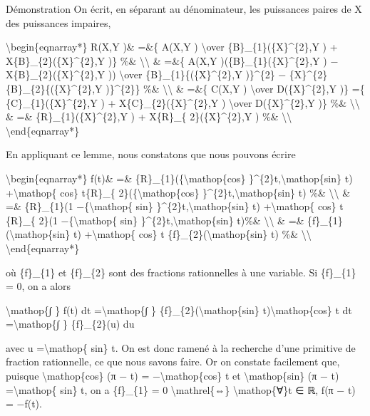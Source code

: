 \documentclass[]{article}
\begin{document}
Démonstration On écrit, en séparant au dénominateur, les puissances
paires de X des puissances impaires,

\textbackslash{}begin\{eqnarray*\} R(X,Y )\& =\&\{ A(X,Y )
\textbackslash{}over \{B\}\_\{1\}(\{X\}\^{}\{2\},Y ) +
X\{B\}\_\{2\}(\{X\}\^{}\{2\},Y )\} \%\& \textbackslash{}\textbackslash{}
\& =\&\{ A(X,Y )(\{B\}\_\{1\}(\{X\}\^{}\{2\},Y ) −
X\{B\}\_\{2\}(\{X\}\^{}\{2\},Y )) \textbackslash{}over
\{B\}\_\{1\}\{(\{X\}\^{}\{2\},Y )\}\^{}\{2\} −
\{X\}\^{}\{2\}\{B\}\_\{2\}\{(\{X\}\^{}\{2\},Y )\}\^{}\{2\}\} \%\&
\textbackslash{}\textbackslash{} \& =\&\{ C(X,Y ) \textbackslash{}over
D(\{X\}\^{}\{2\},Y )\} =\{ \{C\}\_\{1\}(\{X\}\^{}\{2\},Y ) +
X\{C\}\_\{2\}(\{X\}\^{}\{2\},Y ) \textbackslash{}over D(\{X\}\^{}\{2\},Y
)\} \%\& \textbackslash{}\textbackslash{} \& =\&
\{R\}\_\{1\}(\{X\}\^{}\{2\},Y ) + X\{R\}\_\{ 2\}(\{X\}\^{}\{2\},Y ) \%\&
\textbackslash{}\textbackslash{} \textbackslash{}end\{eqnarray*\}

En appliquant ce lemme, nous constatons que nous pouvons écrire

\textbackslash{}begin\{eqnarray*\} f(t)\& =\&
\{R\}\_\{1\}(\{\textbackslash{}mathop\{cos\}
\}\^{}\{2\}t,\textbackslash{}mathop\{sin\} t) +\textbackslash{}mathop\{
cos\} t\{R\}\_\{ 2\}(\{\textbackslash{}mathop\{cos\}
\}\^{}\{2\}t,\textbackslash{}mathop\{sin\} t) \%\&
\textbackslash{}\textbackslash{} \& =\& \{R\}\_\{1\}(1
−\{\textbackslash{}mathop\{ sin\}
\}\^{}\{2\}t,\textbackslash{}mathop\{sin\} t) +\textbackslash{}mathop\{
cos\} t \{R\}\_\{ 2\}(1 −\{\textbackslash{}mathop\{ sin\}
\}\^{}\{2\}t,\textbackslash{}mathop\{sin\} t)\%\&
\textbackslash{}\textbackslash{} \& =\&
\{f\}\_\{1\}(\textbackslash{}mathop\{sin\} t) +\textbackslash{}mathop\{
cos\} t \{f\}\_\{2\}(\textbackslash{}mathop\{sin\} t) \%\&
\textbackslash{}\textbackslash{} \textbackslash{}end\{eqnarray*\}

où \{f\}\_\{1\} et \{f\}\_\{2\} sont des fractions rationnelles à une
variable. Si \{f\}\_\{1\} = 0, on a alors

\textbackslash{}mathop\{∫ \} f(t) dt =\textbackslash{}mathop\{∫ \}
\{f\}\_\{2\}(\textbackslash{}mathop\{sin\}
t)\textbackslash{}mathop\{cos\} t dt =\textbackslash{}mathop\{∫ \}
\{f\}\_\{2\}(u) du

avec u =\textbackslash{}mathop\{ sin\} t. On est donc ramené à la
recherche d'une primitive de fraction rationnelle, ce que nous savons
faire. Or on constate facilement que, puisque
\textbackslash{}mathop\{cos\} (π − t) = −\textbackslash{}mathop\{cos\} t
et \textbackslash{}mathop\{sin\} (π − t) =\textbackslash{}mathop\{ sin\}
t, on a \{f\}\_\{1\} = 0 \textbackslash{}mathrel\{⇔\}
\textbackslash{}mathop\{∀\}t ∈ ℝ, f(π − t) = −f(t).
\end{document}
